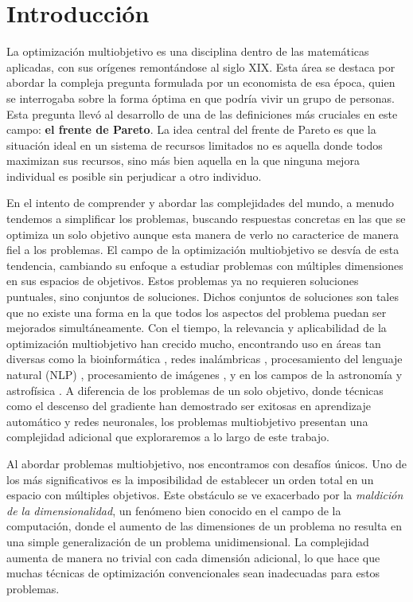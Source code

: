 

\chapter{Introducción}


La optimización multiobjetivo es una disciplina dentro de las matemáticas aplicadas, con sus orígenes remontándose al siglo XIX. Esta área se destaca por abordar la compleja pregunta formulada por un economista de esa época, quien se interrogaba sobre la forma óptima en que podría vivir un grupo de personas. Esta pregunta llevó al desarrollo de una de las definiciones más cruciales en este campo: \textbf{el frente de Pareto}. La idea central del frente de Pareto es que la situación ideal en un sistema de recursos limitados no es aquella donde todos maximizan sus recursos, sino más bien aquella en la que ninguna mejora individual es posible sin perjudicar a otro individuo. 

En el intento de comprender y abordar las complejidades del mundo, a menudo tendemos a simplificar los problemas, buscando respuestas concretas en las que se optimiza un solo objetivo aunque esta manera de verlo no caracterice de manera fiel a los problemas. El campo de la optimización multiobjetivo se desvía de esta tendencia, cambiando su enfoque a estudiar problemas con múltiples dimensiones en sus espacios de objetivos. Estos problemas ya no requieren soluciones puntuales, sino conjuntos de soluciones. Dichos conjuntos de soluciones son tales que no existe una forma en la que todos los aspectos del problema puedan ser mejorados simultáneamente. Con el tiempo, la relevancia y aplicabilidad de la optimización multiobjetivo han crecido mucho, encontrando uso en áreas tan diversas como la bioinformática \cite{handlMultiobjectiveOptimizationBioinformatics2007}, redes inalámbricas \cite{gunjanReviewMultiobjectiveOptimization2023}, procesamiento del lenguaje natural (NLP) \cite{sainiMultiobjectiveOptimizationTechniques2021}, procesamiento de imágenes \cite{aslamComprehensiveSurveyOptimization2020}, y en los campos de la astronomía y astrofísica \cite{mullerUsingMultiobjectiveOptimization2023}. A diferencia de los problemas de un solo objetivo, donde técnicas como el descenso del gradiente han demostrado ser exitosas en aprendizaje automático y redes neuronales, los problemas multiobjetivo presentan una complejidad adicional que exploraremos a lo largo de este trabajo.


Al abordar problemas multiobjetivo, nos encontramos con desafíos únicos. Uno de los más significativos es la imposibilidad de establecer un orden total en un espacio con múltiples objetivos.  Este obstáculo se ve exacerbado por la \emph{maldición de la dimensionalidad}, un fenómeno bien conocido en el campo de la computación, donde el aumento de las dimensiones de un problema no resulta en una simple generalización de un problema unidimensional. La complejidad aumenta de manera no trivial con cada dimensión adicional, lo que hace que muchas técnicas de optimización convencionales sean inadecuadas para estos problemas.

